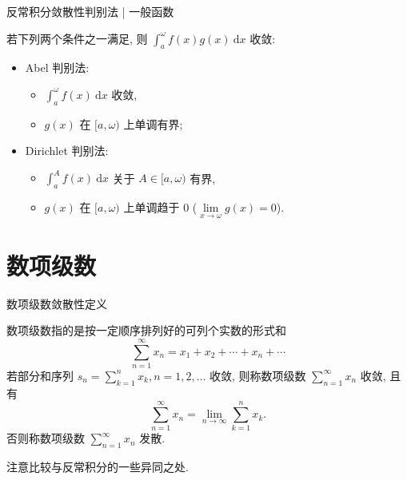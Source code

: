 
\begin{frame}{反常积分敛散性判别法 | 一般函数}

\begin{thm}[A-D 判别法]
若下列两个条件之一满足, 则 $\int_a^\omega f(x)g(x) ~ \mathrm{d} x$ 收敛:
\pause
\vspace{0.5em}
\begin{itemize}
\item Abel 判别法:
\begin{itemize}
\item $\int_a^\omega f(x) ~ \mathrm{d} x$ 收敛,
\item $g(x)$ 在 $[a, \omega)$ 上单调有界;
\end{itemize}
\pause
\vspace{0.5em}
\item Dirichlet 判别法:
\begin{itemize}
\item $\int_a^A f(x) ~ \mathrm{d} x$ 关于 $A \in [a, \omega)$ 有界,
\item $g(x)$ 在 $[a, \omega)$ 上单调趋于 $0$ ($\lim\limits_{x \to \omega} g(x) = 0$).
\end{itemize}
\end{itemize}
\end{thm}

\end{frame}


\section{数项级数}


\begin{frame}{数项级数敛散性定义}

\begin{Def}
数项级数指的是{\color{red}按一定顺序排列好}的可列个实数的形式和
\[\sum\limits_{n=1}^\infty x_n = x_1 + x_2 + \cdots + x_n + \cdots\]
\pause
若部分和序列 $s_n = \sum\limits_{k=1}^n x_k, n = 1, 2, \dots$ 收敛, 则称数项级数 $\sum\limits_{n=1}^\infty x_n$ 收敛, 且有
\[\sum\limits_{n=1}^\infty x_n = \lim\limits_{n\to\infty} \sum\limits_{k=1}^n x_k.\]
否则称数项级数 $\sum\limits_{n=1}^\infty x_n$ 发散.
\end{Def}

\pause

注意比较与反常积分的一些异同之处.

\end{frame}

